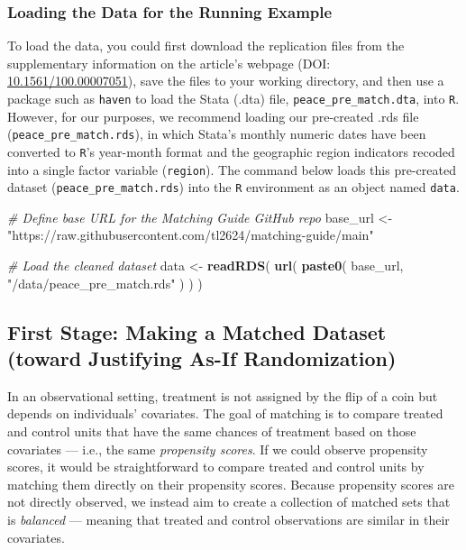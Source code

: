 \documentclass[
  12pt,
  leqno]{article}
\newenvironment{Shaded}{\begin{snugshade}}{\end{snugshade}}
\newcommand{\CommentTok}[1]{\textcolor[rgb]{0.56,0.35,0.01}{\textit{#1}}}
\newcommand{\FunctionTok}[1]{\textcolor[rgb]{0.13,0.29,0.53}{\textbf{#1}}}
\newcommand{\NormalTok}[1]{#1}
\newcommand{\OtherTok}[1]{\textcolor[rgb]{0.56,0.35,0.01}{#1}}
\newcommand{\StringTok}[1]{\textcolor[rgb]{0.31,0.60,0.02}{#1}}
\begin{document}
\subsubsection{Loading the Data for the Running
Example}\label{loading-the-data-for-the-running-example}

To load the data, you could first download the replication files from
the supplementary information on the article's webpage (DOI:
\href{https://doi.org/10.1561/100.00007051}{10.1561/100.00007051}), save
the files to your working directory, and then use a package such as
\texttt{haven} to load the Stata (.dta) file,
\texttt{peace\_pre\_match.dta}, into \texttt{R}. However, for our
purposes, we recommend loading our pre-created .rds file
(\texttt{peace\_pre\_match.rds}), in which Stata's monthly numeric dates
have been converted to \texttt{R}'s year-month format and the geographic
region indicators recoded into a single factor variable
(\texttt{region}). The command below loads this pre-created dataset
(\texttt{peace\_pre\_match.rds}) into the \texttt{R} environment as an
object named \texttt{data}.

\singlespacing

\begin{Shaded}
\begin{Highlighting}[]
\CommentTok{\# Define base URL for the Matching Guide GitHub repo}
\NormalTok{base\_url }\OtherTok{\textless{}{-}} \StringTok{"https://raw.githubusercontent.com/tl2624/matching{-}guide/main"}

\CommentTok{\# Load the cleaned dataset}
\NormalTok{data }\OtherTok{\textless{}{-}} \FunctionTok{readRDS}\NormalTok{(}
  \FunctionTok{url}\NormalTok{(}
    \FunctionTok{paste0}\NormalTok{(}
\NormalTok{      base\_url, }\StringTok{"/data/peace\_pre\_match.rds"}
\NormalTok{    )}
\NormalTok{  )}
\NormalTok{)}
\end{Highlighting}
\end{Shaded}

\doublespacing

\subsection{First Stage: Making a Matched Dataset (toward Justifying
As-If
Randomization)}\label{first-stage-making-a-matched-dataset-toward-justifying-as-if-randomization}

In an observational setting, treatment is not assigned by the flip of a
coin but depends on individuals' covariates. The goal of matching is to
compare treated and control units that have the same chances of
treatment based on those covariates --- i.e., the same \emph{propensity
scores}. If we could observe propensity scores, it would be
straightforward to compare treated and control units by matching them
directly on their propensity scores. Because propensity scores are not
directly observed, we instead aim to create a collection of matched sets
that is \emph{balanced} --- meaning that treated and control
observations are similar in their covariates.
\end{document}
